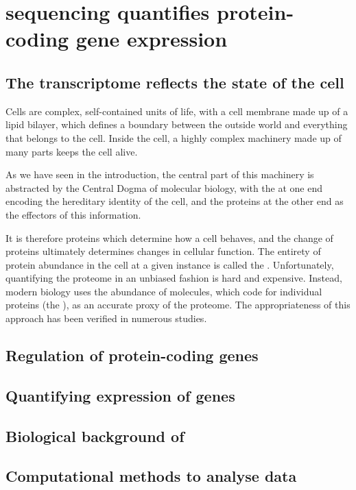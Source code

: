 \chapter{ sequencing quantifies protein-coding gene expression}

\section{The transcriptome reflects the state of the cell}

Cells are complex, self-contained units of life, with a cell membrane made up of
a lipid bilayer, which defines a boundary between the outside world and
everything that belongs to the cell. Inside the cell, a highly complex machinery
made up of many parts keeps the cell alive.

As we have seen in the introduction, the central part of this machinery is
abstracted by the Central Dogma of molecular biology, with the \dna at one end
encoding the hereditary identity of the cell, and the proteins at the other end
as the effectors of this information.

It is therefore proteins which determine how a cell behaves, and the change of
proteins ultimately determines changes in cellular function. The entirety of
protein abundance in the cell at a given instance is called the
. Unfortunately, quantifying the proteome in an unbiased
fashion is hard and expensive. Instead, modern biology uses the
abundance of \mrna molecules, which code for individual proteins (the
), as an accurate proxy of the proteome. The
appropriateness of this approach has been verified in numerous
studies.

\section{Regulation of protein-coding genes}

\section{Quantifying expression of  genes}

\section{Biological background of }

\section{Computational methods to analyse  data}

